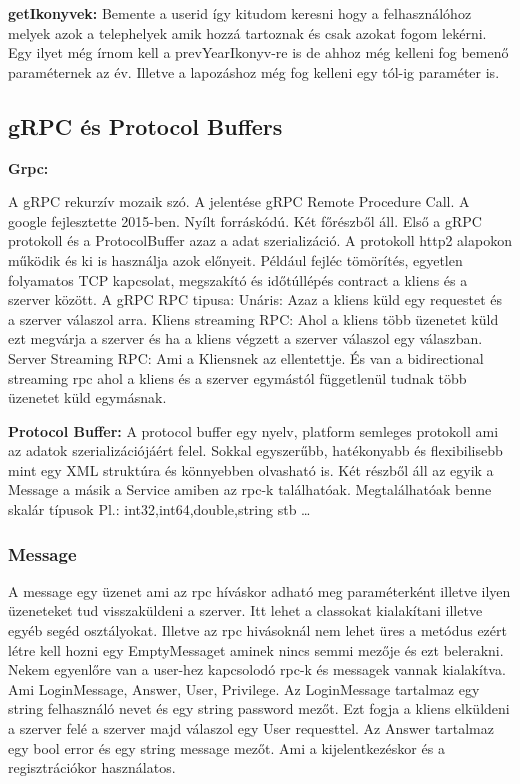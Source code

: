 \documentclass[conference]{IEEEtran}
\begin{document}
 \textbf{getIkonyvek:}
 Bemente a userid így kitudom keresni hogy a felhasználóhoz melyek azok a telephelyek amik hozzá tartoznak és csak azokat fogom lekérni. Egy ilyet még írnom kell a prevYearIkonyv-re is de ahhoz még kelleni fog bemenő paraméternek az év. Illetve a lapozáshoz még fog kelleni egy tól-ig paraméter is.


\subsection{\textbf{gRPC és Protocol Buffers}}
\textbf{Grpc:}

A gRPC rekurzív mozaik szó. A jelentése gRPC Remote Procedure Call. A google fejlesztette 2015-ben. Nyílt forráskódú. Két főrészből áll. Első a gRPC protokoll és a ProtocolBuffer azaz a adat szerializáció. A protokoll http2 alapokon működik és ki is használja azok előnyeit. Például fejléc tömörítés, egyetlen folyamatos TCP kapcsolat, megszakító és időtúllépés contract a kliens és a szerver között. A gRPC RPC tipusa: Unáris: Azaz a kliens küld egy requestet és a szerver válaszol arra. Kliens streaming RPC: Ahol a kliens több üzenetet küld ezt megvárja a szerver és ha a kliens végzett a szerver válaszol egy válaszban. Server Streaming RPC: Ami a Kliensnek az ellentettje. És van a bidirectional streaming rpc ahol a kliens és a szerver egymástól függetlenül tudnak több üzenetet küld egymásnak. 

\textbf{Protocol Buffer:}
A protocol buffer egy nyelv, platform semleges protokoll ami az adatok szerializációjáért felel. Sokkal egyszerűbb, hatékonyabb és flexibilisebb mint egy XML struktúra és könnyebben olvasható is. Két részből áll az egyik a Message a másik a Service amiben az rpc-k találhatóak. Megtalálhatóak benne skalár típusok Pl.: int32,int64,double,string stb \dots 

\subsubsection{Message}
A message egy üzenet ami az rpc híváskor adható meg paraméterként illetve ilyen üzeneteket tud visszaküldeni a szerver. Itt lehet a classokat kialakítani illetve egyéb segéd osztályokat. Illetve az rpc hivásoknál nem lehet üres a metódus ezért létre kell hozni egy EmptyMessaget aminek nincs semmi mezője és ezt belerakni. Nekem egyenlőre van a user-hez kapcsolodó rpc-k és messagek vannak kialakítva. Ami LoginMessage, Answer, User, Privilege. Az LoginMessage tartalmaz egy string felhasználó nevet és egy string password mezőt. Ezt fogja a kliens elküldeni a szerver felé a szerver majd válaszol egy User requesttel. Az Answer tartalmaz egy bool error és egy string message mezőt. Ami a kijelentkezéskor és a regisztrációkor használatos. 
\end{document}
